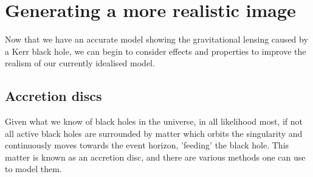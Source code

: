 \documentclass[oneside,openright,frontopenright, singlespacing]{dmathesis}
\begin{document}
\chapter{Generating a more realistic image}\label{chap:Chapter5}

	Now that we have an accurate model showing the gravitational lensing caused by a Kerr black hole, we can begin to consider effects and properties to improve the realism of our currently idealised model.

\section{Accretion discs}\label{sec:Section5.1}

	Given what we know of black holes in the universe, in all likelihood most, if not all active black holes are surrounded by matter which orbits the singularity and continuously moves towards the event horizon, 'feeding' the black hole. This matter is known as an accretion disc, and there are various methods one can use to model them.
\end{document}

